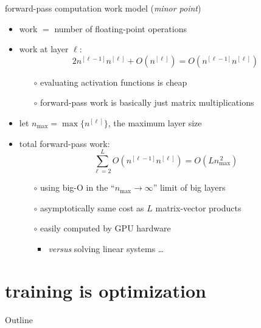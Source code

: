 \documentclass[xcolor={svgnames},
               hyperref={colorlinks,citecolor=DeepPink4,linkcolor=FireBrick,urlcolor=Maroon}]
               {beamer}
\begin{document}
\begin{frame}{forward-pass computation work model (\emph{minor point})}

\begin{itemize}
\item \alert{work} $=$ number of floating-point operations
\item work at layer $\ell$:
    $$2 n^{[\ell-1]} n^{[\ell]} + O(n^{[\ell]}) = O(n^{[\ell-1]} n^{[\ell]})$$

    \begin{itemize}
    \item[$\circ$] evaluating activation functions is cheap
    \item[$\circ$] forward-pass work is basically just matrix multiplications
    \end{itemize}
\item let $n_{\text{max}} =\max\{n^{[\ell]}\}$, the maximum layer size
\item total forward-pass work:
    $$\sum_{\ell=2}^L O(n^{[\ell-1]} n^{[\ell]}) = O(L n_{\text{max}}^{\,2})$$

    \begin{itemize}
    \item[$\circ$] using big-O in the ``$n_{\text{max}} \to \infty$'' limit of big layers
    \item[$\circ$] asymptotically same cost as $L$ matrix-vector products
    \item[$\circ$] easily computed by GPU hardware
        \begin{itemize}
        \item \emph{versus} solving linear systems \dots
        \end{itemize}
    \end{itemize}
\end{itemize}
\end{frame}


\section{training is optimization}

\begin{frame}{Outline}
\end{frame}
\end{document}
